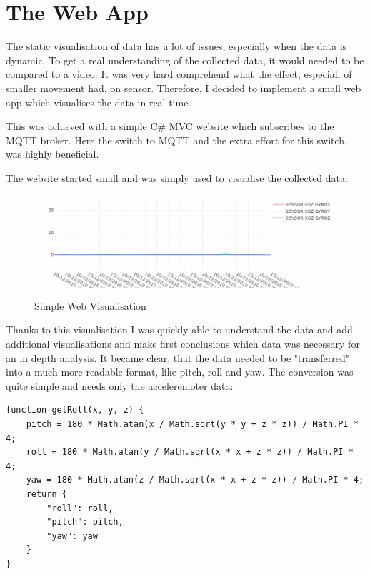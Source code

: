 \section{The Web App}

The static visualisation of data has a lot of issues, especially when the data is dynamic. To get a real understanding of the collected data, it would needed to be compared to a video. It was very hard comprehend what the effect, especiall of smaller movement had, on sensor. Therefore, I decided to implement a small web app which visualises the data in real time. 

This was achieved with a simple C\# \gls{MVC} website which subscribes to the MQTT broker. Here the switch to MQTT and the extra effort for this switch, was highly beneficial.

The website started small and was simply used to visualise the collected data:
\begin{figure}[h]
  \begin{center}
\includegraphics[width=\linewidth]{images/WebVisualisation_SIMPLE.png}
  \end{center}
  \caption{Simple Web Visualisation}
  \label{fig:SimpleWebVisualisation}
\end{figure}

Thanks to this visualisation I was quickly able to understand the data and add additional visualisations and make first conclusions which data was necessary for an in depth analysis. It became clear, that the data needed to be "transferred" into a much more readable format, like pitch, roll and yaw. The conversion was quite simple and needs only the acceleremoter data:
\vspace{-5pt}
\begin{lstlisting}
function getRoll(x, y, z) {
    pitch = 180 * Math.atan(x / Math.sqrt(y * y + z * z)) / Math.PI * 4;
    roll = 180 * Math.atan(y / Math.sqrt(x * x + z * z)) / Math.PI * 4;
    yaw = 180 * Math.atan(z / Math.sqrt(x * x + z * z)) / Math.PI * 4;
    return {
        "roll": roll,
        "pitch": pitch,
        "yaw": yaw
    }
}
\end{lstlisting}
\cite{Beginner65:online}


